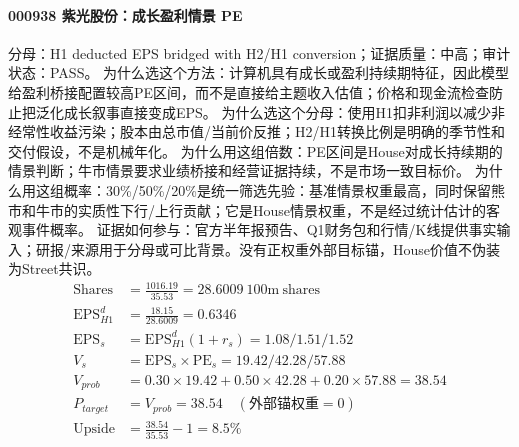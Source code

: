 \paragraph{000938 紫光股份：成长盈利情景 PE}
分母：H1 deducted EPS bridged with H2/H1 conversion；证据质量：中高；审计状态：PASS。
为什么选这个方法：计算机具有成长或盈利持续期特征，因此模型给盈利桥接配置较高PE区间，而不是直接给主题收入估值；价格和现金流检查防止把泛化成长叙事直接变成EPS。
为什么选这个分母：使用H1扣非利润以减少非经常性收益污染；股本由总市值/当前价反推；H2/H1转换比例是明确的季节性和交付假设，不是机械年化。
为什么用这组倍数：PE区间是House对成长持续期的情景判断；牛市情景要求业绩桥接和经营证据持续，不是市场一致目标价。
为什么用这组概率：30\%/50\%/20\%是统一筛选先验：基准情景权重最高，同时保留熊市和牛市的实质性下行/上行贡献；它是House情景权重，不是经过统计估计的客观事件概率。
证据如何参与：官方半年报预告、Q1财务包和行情/K线提供事实输入；研报/来源用于分母或可比背景。没有正权重外部目标锚，House价值不伪装为Street共识。
\begin{align*}
\mathrm{Shares} &= \frac{1016.19}{35.53}=28.6009\ \mathrm{100m\ shares}\\
\mathrm{EPS}_{H1}^d &= \frac{18.15}{28.6009}=0.6346\\
\mathrm{EPS}_s &= \mathrm{EPS}_{H1}^d(1+r_s)=1.08/1.51/1.52\\
V_s &= \mathrm{EPS}_s\times \mathrm{PE}_s=19.42/42.28/57.88\\
V_{prob} &= 0.30\times 19.42+0.50\times 42.28+0.20\times 57.88=38.54\\
P_{target} &= V_{prob}=38.54\quad(\text{外部锚权重}=0)\\
\mathrm{Upside} &= \frac{38.54}{35.53}-1=8.5\%\\
\end{align*}

